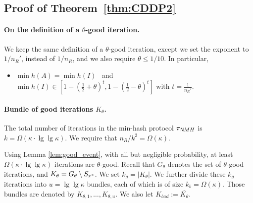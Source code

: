 \subsection{Proof of Theorem~\ref{thm:CDDP2}}\label{apx:proof_CDDP2}
\paragraph{On the definition of a $\theta$-good iteration.}
We keep the same definition of a $\theta$-good iteration, except we set the
exponent to $1/n_R'$, instead of $1/n_R$, and we also require $\theta \le 1/10$. 
In particular, 
\begin{itemize}
    \item $\min h(A) = \min h(I)$
    ~and~ $\min h(I) \in
    \left[1-\left(\frac{1}{2}+\theta\right)^t, 
        1-\left(\frac{1}{2}-\theta\right)^t\right]$
        with $\boxed{t = \frac{1}{n_R'}}$. 
\end{itemize}
%


\paragraph{Bundle of good iterations $K_\theta$.}
The total number of iterations in the min-hash protocol $\pi_{\mathsf NMH}$ is $k =
\Omega(\kappa \cdot \lg\lg\kappa)$. We require that $n_R/k^2 =
\Omega(\kappa)$. 

Using Lemma \ref{lem:good_event}, with all but negligible probability,
at least $\Omega(\kappa \cdot \lg\lg\kappa)$ iterations are
$\theta$-good. Recall that $G_\theta$ denotes the set of $\theta$-good
iterations, and $K_\theta = G_\theta \setminus S_{x^*}$. We set $k_g =
|K_\theta|$.  
%
We further divide these $k_g$ iterations into $u = \lg\lg \kappa$ bundles, each of which 
is of size $k_b = \Omega(\kappa)$.  
Those bundles are denoted by $K_{\theta, 1}, \ldots, K_{\theta,u}$. We also let $K_{bad} := \overline{K_{\theta}}$. 



